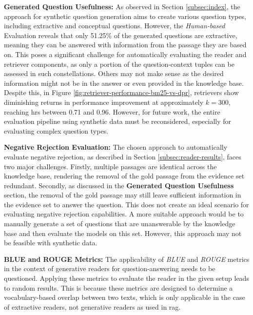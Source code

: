 \vspace{\baselineskip}
\noindent\textbf{Generated Question Usefulness:} As observed in Section \ref{subsec:index}, the approach for synthetic question generation aims to create various question types, including extractive and conceptual questions. However, the \textit{Human-based} Evaluation reveals that only 51.25\% of the generated questions are extractive, meaning they can be answered with information from the passage they are based on. This poses a significant challenge for automatically evaluating the reader and retriever components, as only a portion of the question-context tuples can be assessed in such constellations. Others may not make sense as the desired information might not be in the answer or even provided in the knowledge base. Despite this, in Figure \ref{fig:retriever-performance-bm25-vs-dpr}, retrievers show diminishing returns in performance improvement at approximately $k = 300$, reaching \gls{hr}s between 0.71 and 0.96. However, for future work, the entire evaluation pipeline using synthetic data must be reconsidered, especially for evaluating complex question types.

\vspace{\baselineskip}
\noindent\textbf{Negative Rejection Evaluation:} The chosen approach to automatically evaluate negative rejection, as described in Section \ref{subsec:reader-results}, faces two major challenges. Firstly, multiple passages are identical across the knowledge base, rendering the removal of the gold passage from the evidence set redundant. Secondly, as discussed in the \textbf{Generated Question Usefulness} section, the removal of the gold passage may still leave sufficient information in the evidence set to answer the question. This does not create an ideal scenario for evaluating negative rejection capabilities. A more suitable approach would be to manually generate a set of questions that are unanswerable by the knowledge base and then evaluate the models on this set. However, this approach may not be feasible with synthetic data.

\vspace{\baselineskip}
\noindent\textbf{BLUE and ROUGE Metrics:} The applicability of \textit{BLUE} and \textit{ROUGE} metrics in the context of generative readers for question-answering needs to be questioned. Applying these metrics to evaluate the reader in the given setup leads to random results. This is because these metrics are designed to determine a vocabulary-based overlap between two texts, which is only applicable in the case of extractive readers, not generative readers as used in \gls{rag}.



